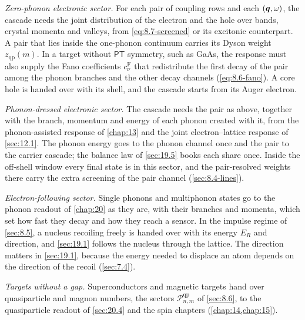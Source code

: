 \emph{Zero-phonon electronic sector.} For each pair of coupling rows and each $(\bm{q},\omega)$, the cascade needs the joint distribution of the electron and the hole over bands, crystal momenta and valleys, from \cref{eq:8.7-screened} or its excitonic counterpart. A pair that lies inside the one-phonon continuum carries its Dyson weight $z_{\mathrm{qp}}(m)$. In a target without $\mathsf{P}\mathsf{T}$ symmetry, such as GaAs, the response must also supply the Fano coefficients $c^{\mathrm{F}}_\nu$ that redistribute the first decay of the pair among the phonon branches and the other decay channels (\cref{eq:8.6-fano}). A core hole is handed over with its shell, and the cascade starts from its Auger electron.

\emph{Phonon-dressed electronic sector.} The cascade needs the pair as above, together with the branch, momentum and energy of each phonon created with it, from the phonon-assisted response of \cref{chap:13} and the joint electron--lattice response of \cref{sec:12.1}. The phonon energy goes to the phonon channel once and the pair to the carrier cascade; the balance law of \cref{sec:19.5} books each share once. Inside the off-shell window every final state is in this sector, and the pair-resolved weights there carry the extra screening of the pair channel (\cref{sec:8.4-lines}).

\emph{Electron-following sector.} Single phonons and multiphonon states go to the phonon readout of \cref{chap:20} as they are, with their branches and momenta, which set how fast they decay and how they reach a sensor. In the impulse regime of \cref{sec:8.5}, a nucleus recoiling freely is handed over with its energy $E_R$ and direction, and \cref{sec:19.1} follows the nucleus through the lattice. The direction matters in \cref{sec:19.1}, because the energy needed to displace an atom depends on the direction of the recoil (\cref{sec:7.4}).

\emph{Targets without a gap.} Superconductors and magnetic targets hand over quasiparticle and magnon numbers, the sectors $\mathcal{P}^{\mathrm{qp}}_{n,m}$ of \cref{sec:8.6}, to the quasiparticle readout of \cref{sec:20.4} and the spin chapters (\cref{chap:14,chap:15}).

